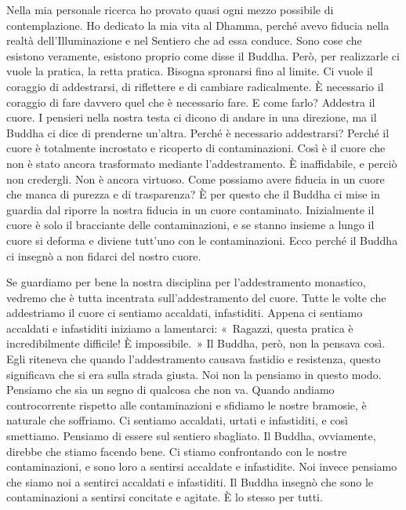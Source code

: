 Nella mia personale ricerca ho provato quasi ogni mezzo possibile di
contemplazione. Ho dedicato la mia vita al Dhamma, perché avevo fiducia
nella realtà dell'Illuminazione e nel Sentiero che ad essa conduce. Sono
cose che esistono veramente, esistono proprio come disse il Buddha.
Però, per realizzarle ci vuole la pratica, la retta pratica. Bisogna
spronarsi fino al limite. Ci vuole il coraggio di addestrarsi, di
riflettere e di cambiare radicalmente. È necessario il coraggio di fare
davvero quel che è necessario fare. E come farlo? Addestra il cuore. I
pensieri nella nostra testa ci dicono di andare in una direzione, ma il
Buddha ci dice di prenderne un'altra. Perché è necessario addestrarsi?
Perché il cuore è totalmente incrostato e ricoperto di contaminazioni.
Così è il cuore che non è stato ancora trasformato mediante
l'addestramento. È inaffidabile, e perciò non credergli. Non è ancora
virtuoso. Come possiamo avere fiducia in un cuore che manca di purezza e
di trasparenza? È per questo che il Buddha ci mise in guardia dal
riporre la nostra fiducia in un cuore contaminato. Inizialmente il cuore
è solo il bracciante delle contaminazioni, e se stanno insieme a lungo
il cuore si deforma e diviene tutt'uno con le contaminazioni. Ecco
perché il Buddha ci insegnò a non fidarci del nostro cuore.

Se guardiamo per bene la nostra disciplina per l'addestramento
monastico, vedremo che è tutta incentrata sull'addestramento del cuore.
Tutte le volte che addestriamo il cuore ci sentiamo accaldati,
infastiditi. Appena ci sentiamo accaldati e infastiditi iniziamo a
lamentarci: «~Ragazzi, questa pratica è incredibilmente difficile! È
impossibile.~» Il Buddha, però, non la pensava così. Egli riteneva che
quando l'addestramento causava fastidio e resistenza, questo significava
che si era sulla strada giusta. Noi non la pensiamo in questo modo.
Pensiamo che sia un segno di qualcosa che non va. Quando andiamo
controcorrente rispetto alle contaminazioni e sfidiamo le nostre
bramosie, è naturale che soffriamo. Ci sentiamo accaldati, urtati e
infastiditi, e così smettiamo. Pensiamo di essere sul sentiero
sbagliato. Il Buddha, ovviamente, direbbe che stiamo facendo bene. Ci
stiamo confrontando con le nostre contaminazioni, e sono loro a sentirsi
accaldate e infastidite. Noi invece pensiamo che siamo noi a sentirci
accaldati e infastiditi. Il Buddha insegnò che sono le contaminazioni a
sentirsi concitate e agitate. È lo stesso per tutti.

